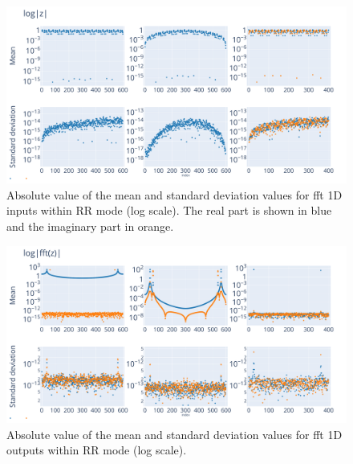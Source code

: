 \documentclass[10pt,journal,compsoc]{IEEEtran}
\begin{document}
\begin{figure}
    \centering
    \includegraphics[width=\linewidth]{figure/FFT/fft_x.pdf}
    \caption{Absolute value of the mean and standard deviation values for fft 1D
        inputs within RR mode (log scale). The real part is shown in blue and
        the imaginary part in orange.}
    \label{fig:fft1D_inputs}
\end{figure}

\begin{figure}
    \centering
    \includegraphics[width=\linewidth]{figure/FFT/fft_y.pdf}
    \caption{Absolute value of the mean and standard deviation values
        for fft 1D outputs within RR mode (log scale).}
    \label{fig:fft1D_outputs}
\end{figure}
\end{document}
